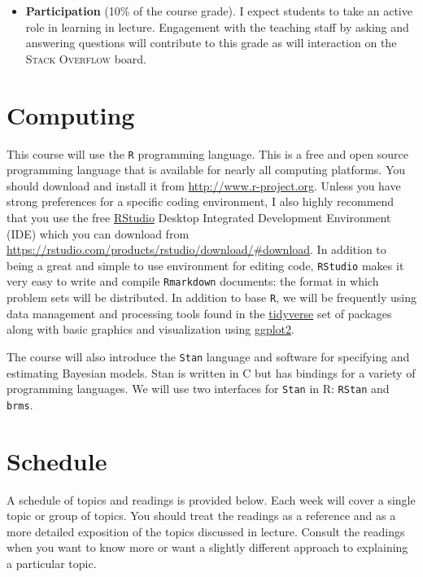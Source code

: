 \documentclass[11pt, article, oneside]{memoir}
\theoremstyle{Assumption}
\begin{document}
\begin{itemize}
    \item \textbf{Participation} (10\% of the course grade). I expect students to take an active role in learning in lecture. Engagement with the teaching staff by asking and answering questions will contribute to this grade as will interaction on the \textsc{Stack Overflow} board.
\end{itemize}

\section*{Computing}

This course will use the \texttt{R} programming language. This is a free and open source programming language that is available for nearly all computing platforms. You should download and install it from \url{http://www.r-project.org}. Unless you have strong preferences for a specific coding environment, I also highly recommend that you use the free \href{https://rstudio.com}{RStudio} Desktop Integrated Development Environment (IDE) which you can download from \url{https://rstudio.com/products/rstudio/download/#download}. In addition to being a great and simple to use environment for editing code, \texttt{RStudio} makes it very easy to write and compile \texttt{Rmarkdown} documents: the format in which problem sets will be distributed. In addition to base \texttt{R}, we will be frequently using data management and processing tools found in the \href{https://www.tidyverse.org/}{tidyverse} set of packages along with basic graphics and visualization using \href{https://ggplot2.tidyverse.org/}{ggplot2}. 

The course will also introduce the \texttt{Stan} language and software for specifying and estimating Bayesian models. Stan is written in C but has bindings for a variety of programming languages. We will use two interfaces for \texttt{Stan} in R: \texttt{RStan} and \texttt{brms}. 

\section*{Schedule}

A schedule of topics and readings is provided below. Each week will cover a single topic or group of topics. You should treat the readings as a reference and as a more detailed exposition of the topics discussed in lecture. Consult the readings when you want to know more or want a slightly different approach to explaining a particular topic.
\end{document}
